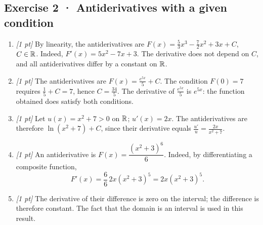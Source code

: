 \subsection*{Exercise 2 · Antiderivatives with a given condition}\begin{enumerate}

\item \textit{[1 pt]} By linearity, the antiderivatives are $F(x)=\frac{5}{3}x^3-\frac{7}{2}x^2+3x+C$, $C\in\mathbb R$. Indeed, $F'(x)=5x^2-7x+3$. The derivative does not depend on $C$, and all antiderivatives differ by a constant on $\mathbb R$.

\item \textit{[1 pt]} The antiderivatives are $F(x)=\frac{e^{5x}}{5}+C$. The condition $F(0)=7$ requires $\frac{1}{5}+C=7$, hence $C=\frac{34}{5}$. The derivative of $\frac{e^{5x}}{5}$ is $e^{5x}$: the function obtained does satisfy both conditions.

\item \textit{[1 pt]} Let $u(x)=x^2+7>0$ on $\mathbb R$; $u'(x)=2x$. The antiderivatives are therefore $\ln(x^2+7)+C$, since their derivative equals $\frac{u'}{u}=\frac{2x}{x^2+7}$.

\item \textit{[1 pt]} An antiderivative is $F(x)=\dfrac{(x^2+3)^{6}}{6}$. Indeed, by differentiating a composite function,
\[F'(x)=\frac{6}{6}\,2x(x^2+3)^{5}=2x(x^2+3)^{5}.\]

\item \textit{[1 pt]} The derivative of their difference is zero on the interval; the difference is therefore constant. The fact that the domain is an interval is used in this result.

\end{enumerate}

